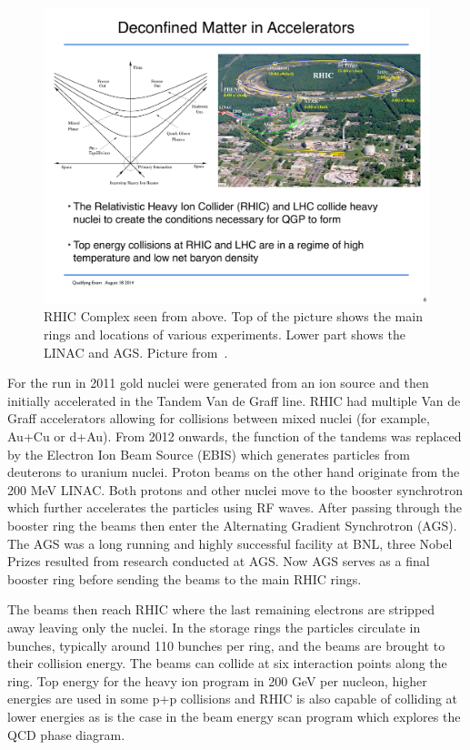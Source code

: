 \begin{figure}[htbp]
\begin{center}
\includegraphics[scale=0.75]{Plots/Detector/RHIC_Complex.pdf}
\end{center}
\caption[RHIC Facility]{RHIC Complex seen from above. Top of the picture shows the main rings and locations of various experiments. Lower part shows the LINAC and AGS. Picture from~\cite{RHICpic}.}
\label{fig:RHIC}
\end{figure}

For the run in 2011 gold nuclei were generated from an ion source and then initially accelerated in the Tandem Van de Graff line. RHIC had multiple Van de Graff accelerators allowing for collisions between mixed nuclei (for example, Au+Cu or d+Au). From 2012 onwards, the function of the tandems was replaced by the Electron Ion Beam Source (EBIS) which generates particles from deuterons to uranium nuclei. Proton beams on the other hand originate from the 200 MeV LINAC. Both protons and other nuclei move to the booster synchrotron which further accelerates the particles using RF waves. After passing through the booster ring the beams then enter the Alternating Gradient Synchrotron (AGS). The AGS was a long running and highly successful facility at BNL, three Nobel Prizes resulted from research conducted at AGS. Now AGS serves as a final booster ring before sending the beams to the main RHIC rings. 

The beams then reach RHIC where the last remaining electrons are stripped away leaving only the nuclei. In the storage rings the particles circulate in bunches, typically around 110 bunches per ring, and the beams are brought to their collision energy. The beams can collide at six interaction points along the ring. Top energy for the heavy ion program in 200 GeV per nucleon, higher energies are used in some p+p collisions and RHIC is also capable of colliding at lower energies as is the case in the beam energy scan program which explores the QCD phase diagram.

